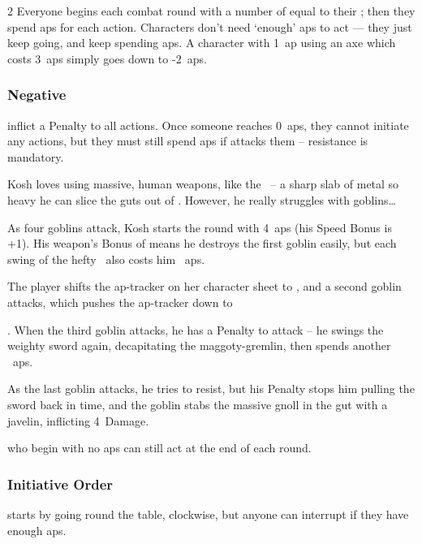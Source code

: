 \begin{multicols}{2}
Everyone begins each \gls{combat} \gls{round} with a number of  equal to their ; then they spend \glspl{ap} for each action.
Characters don't need `enough' \glspl{ap} to act --- they just keep going, and keep spending \glspl{ap}.
A character with 1~\gls{ap} using an axe which costs 3~\glspl{ap} simply goes down to -2~\glspl{ap}.

\subsubsection{Negative }
inflict a Penalty to all \glspl{action}.
Once someone reaches 0~\glspl{ap}, they cannot initiate any actions, but they must still spend \glspl{ap} if  attacks them -- resistance is mandatory.

\begin{exampletext}
  \noindent
  Kosh loves using massive, human weapons, like the \greatsword\weaponName\ -- a sharp slab of metal so heavy he can slice the guts out of .
  However, he really struggles with goblins\ldots

  \sffamily
  As four goblins attack, Kosh starts the \gls{round} with 4~\glspl{ap} (his Speed Bonus is +1).
  His weapon's Bonus of  means he destroys the first goblin easily, but each swing of the hefty \weaponName\ also costs him ~\glspl{ap}.
  \setcounter{track}{4}
  \addtocounter{track}{-\value{heft}}

  The player shifts the \gls{ap}-tracker on her character sheet to , and a second goblin attacks, which pushes the \gls{ap}-tracker down to
  \addtocounter{track}{-\value{heft}}
  .
  When the third goblin attacks, he has a  Penalty to attack -- he swings the weighty sword again, decapitating the maggoty-gremlin, then spends another ~\glspl{ap}.
  \addtocounter{track}{-\value{heft}}
  As the last goblin attacks, he tries to resist, but his  Penalty stops him pulling the sword back in time, and the goblin stabs the massive gnoll in the gut with a javelin, inflicting 4~Damage.
\end{exampletext}

who begin with no \glspl{ap} can still act at the end of each \gls{round}.

\subsubsection{Initiative Order}
\label{initiativeOrdering}
starts by going round the table, clockwise, but anyone can interrupt if they have enough \glspl{ap}.


\end{multicols}
